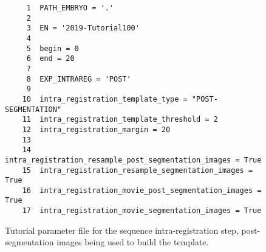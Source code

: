 \begin{figure}
\begin{framed}
\begin{verbatim}
     1	PATH_EMBRYO = '.'
     2	
     3	EN = '2019-Tutorial100'
     4	
     5	begin = 0
     6	end = 20
     7	
     8	EXP_INTRAREG = 'POST'
     9	
    10	intra_registration_template_type = "POST-SEGMENTATION"
    11	intra_registration_template_threshold = 2
    12	intra_registration_margin = 20
    13	
    14	intra_registration_resample_post_segmentation_images = True
    15	intra_registration_resample_segmentation_images = True
    16	intra_registration_movie_post_segmentation_images = True
    17	intra_registration_movie_segmentation_images = True
\end{verbatim}
\end{framed}
\caption{\label{fig:tutorial:parameter:intra:registration:post} Tutorial
  parameter file for the sequence intra-registration step,
  post-segmentation images being used to build the template.}
\end{figure}

